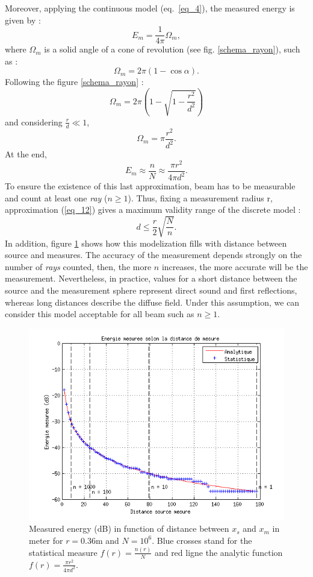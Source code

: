 \documentclass[AMA,STIX1COL]{WileyNJD-v2}
\begin{document}
Moreover, applying the continuous model (eq.~\ref{eq_4}), the measured energy is given by :
\begin{equation}
E_m = \frac{1}{4\pi}  \Omega_m,
\end{equation}
where $\Omega_m$ is a solid angle of a cone of revolution (see fig. \ref{schema_rayon}), such as :
\begin{equation}
\Omega_m = 2\pi(1-\cos{\alpha}).
\end{equation}
Following the figure \ref{schema_rayon} :
\begin{equation}
\Omega_m = 2\pi \left( 1 - \sqrt{1-\frac{r^2}{d^2}} \right)
\end{equation}
and considering $\frac{r}{d} \ll 1$, 
\begin{equation}
\Omega_m = \pi \frac{r^2}{d^2}.
\end{equation}
At the end, 
\begin{equation}
E_m \approx  \frac{n}{N} \approx  \frac{\pi r^2}{4\pi d^2}.
\label{eq_12}
\end{equation}
To ensure the existence of this last approximation, beam has to be measurable and count at least one \textit{ray} ($n\geq1$). Thus, fixing a measurement radius r, approximation (\ref{eq_12}) gives a maximum validity range of the discrete model :  
\begin{equation}
\label{eq_13}
	d \leq \frac{r}{2}\sqrt{\frac{N}{n}}.
\end{equation}
In addition, figure \ref{energie} shows how this modelization fills with distance between source and measures. The accuracy of the measurement depends strongly on the number of  \textit{rays} counted, then, the more $n$ increases, the more accurate will be the measurement. Nevertheless, in practice, values for a short distance between the source and the measurement sphere represent direct sound and first reflections, whereas long distances describe the diffuse field. Under this assumption, we can consider this model acceptable for all beam such as $n\geq1$. 

\begin{figure}[t]
\centering
	\includegraphics[width=0.8\linewidth]{energie.png}
	\caption{Measured energy (dB) in function of distance between $x_s$ and $x_m$ in meter for $r = 0.36$m and $N = 10^6$. Blue crosses stand for the statistical measure $f(r) = \frac{n(r)}{N}$ and red ligne the analytic function $f(r) = \frac{\pi r^2}{4\pi d^2}$.}
	\label{energie}
\end{figure}
\end{document}
